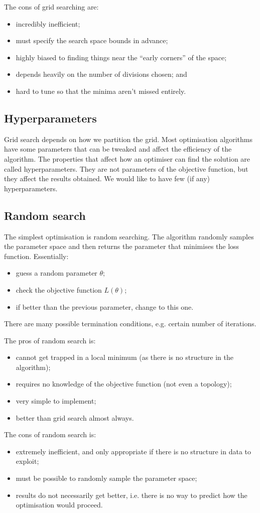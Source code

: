\documentclass[a4paper, openany]{memoir}
\begin{document}
The cons of grid searching are:
\begin{itemize}
    \item incredibly inefficient;
    \item must specify the search space bounds in advance;
    \item highly biased to finding things near the ``early corners'' of the space;
    \item depends heavily on the number of divisions chosen; and
    \item hard to tune so that the minima aren't missed entirely.
\end{itemize}

\subsection{Hyperparameters}
Grid search depends on how we partition the grid. Most optimisation algorithms have some parameters that can be tweaked and affect the efficiency of the algorithm. The properties that affect how an optimiser can find the solution are called hyperparameters. They are not parameters of the objective function, but they affect the results obtained. We would like to have few (if any) hyperparameters.

\subsection{Random search}
The simplest optimisation is random searching. The algorithm randomly samples the parameter space and then returns the parameter that minimises the loss function. Essentially:
\begin{itemize}
    \item guess a random parameter $\theta$;
    \item check the objective function $L(\theta)$;
    \item if better than the previous parameter, change to this one.
\end{itemize}
There are many possible termination conditions, e.g. certain number of iterations.

The pros of random search is:
\begin{itemize}
    \item cannot get trapped in a local minimum (as there is no structure in the algorithm);
    \item requires no knowledge of the objective function (not even a topology);
    \item very simple to implement;
    \item better than grid search almost always.
\end{itemize}
The cons of random search is:
\begin{itemize}
    \item extremely inefficient, and only appropriate if there is no structure in data to exploit;
    \item must be possible to randomly sample the parameter space;
    \item results do not necessarily get better, i.e. there is no way to predict how the optimisation would proceed.
\end{itemize}
\end{document}

